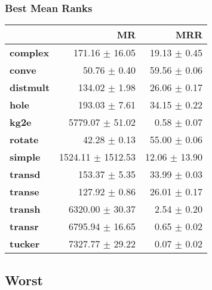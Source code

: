 \documentclass{article}
\begin{document}
    \subsubsection{Best Mean Ranks}
    \begin{center}
    \begin{tabular}{lrr}
\toprule
{} &                 MR &            MRR \\
\midrule
\textbf{complex } &     171.16 $\pm$ 16.05 &   19.13 $\pm$ 0.45 \\
\textbf{conve   } &       50.76 $\pm$ 0.40 &   59.56 $\pm$ 0.06 \\
\textbf{distmult} &      134.02 $\pm$ 1.98 &   26.06 $\pm$ 0.17 \\
\textbf{hole    } &      193.03 $\pm$ 7.61 &   34.15 $\pm$ 0.22 \\
\textbf{kg2e    } &    5779.07 $\pm$ 51.02 &    0.58 $\pm$ 0.07 \\
\textbf{rotate  } &       42.28 $\pm$ 0.13 &   55.00 $\pm$ 0.06 \\
\textbf{simple  } &  1524.11 $\pm$ 1512.53 &  12.06 $\pm$ 13.90 \\
\textbf{transd  } &      153.37 $\pm$ 5.35 &   33.99 $\pm$ 0.03 \\
\textbf{transe  } &      127.92 $\pm$ 0.86 &   26.01 $\pm$ 0.17 \\
\textbf{transh  } &    6320.00 $\pm$ 30.37 &    2.54 $\pm$ 0.20 \\
\textbf{transr  } &    6795.94 $\pm$ 16.65 &    0.65 $\pm$ 0.02 \\
\textbf{tucker  } &    7327.77 $\pm$ 29.22 &    0.07 $\pm$ 0.02 \\
\bottomrule
\end{tabular}

    \end{center}
    \subsection{Worst}
\end{document}
